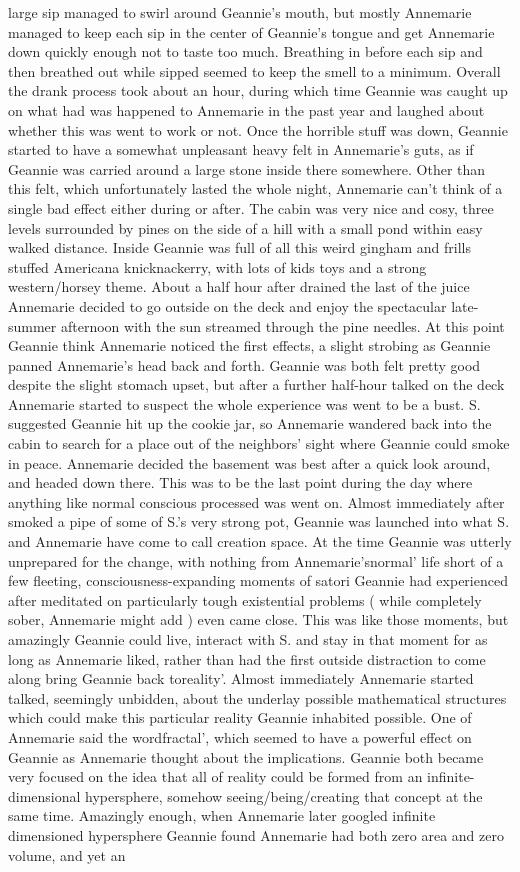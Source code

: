 \documentclass[12pt]{book}
\begin{document}
large sip managed to swirl around Geannie's mouth, but mostly Annemarie managed to keep each sip in the center of Geannie's tongue and get Annemarie down quickly enough not to taste too much. Breathing in before each sip and then breathed out while sipped seemed to keep the smell to a minimum. Overall the drank process took about an hour, during which time Geannie was caught up on what had was happened to Annemarie in the past year and laughed about whether this was went to work or not. Once the horrible stuff was down, Geannie started to have a somewhat unpleasant heavy felt in Annemarie's guts, as if Geannie was carried around a large stone inside there somewhere. Other than this felt, which unfortunately lasted the whole night, Annemarie can't think of a single bad effect either during or after. The cabin was very nice and cosy, three levels surrounded by pines on the side of a hill with a small pond within easy walked distance. Inside Geannie was full of all this weird gingham and frills stuffed Americana knicknackerry, with lots of kids toys and a strong western/horsey theme. About a half hour after drained the last of the juice Annemarie decided to go outside on the deck and enjoy the spectacular late-summer afternoon with the sun streamed through the pine needles. At this point Geannie think Annemarie noticed the first effects, a slight strobing as Geannie panned Annemarie's head back and forth. Geannie was both felt pretty good despite the slight stomach upset, but after a further half-hour talked on the deck Annemarie started to suspect the whole experience was went to be a bust. S. suggested Geannie hit up the cookie jar, so Annemarie wandered back into the cabin to search for a place out of the neighbors' sight where Geannie could smoke in peace. Annemarie decided the basement was best after a quick look around, and headed down there. This was to be the last point during the day where anything like normal conscious processed was went on. Almost immediately after smoked a pipe of some of S.'s very strong pot, Geannie was launched into what S. and Annemarie have come to call creation space. At the time Geannie was utterly unprepared for the change, with nothing from Annemarie'snormal' life short of a few fleeting, consciousness-expanding moments of satori Geannie had experienced after meditated on particularly tough existential problems ( while completely sober, Annemarie might add ) even came close. This was like those moments, but amazingly Geannie could live, interact with S. and stay in that moment for as long as Annemarie liked, rather than had the first outside distraction to come along bring Geannie back toreality'. Almost immediately Annemarie started talked, seemingly unbidden, about the underlay possible mathematical structures which could make this particular reality Geannie inhabited possible. One of Annemarie said the wordfractal', which seemed to have a powerful effect on Geannie as Annemarie thought about the implications. Geannie both became very focused on the idea that all of reality could be formed from an infinite-dimensional hypersphere, somehow seeing/being/creating that concept at the same time. Amazingly enough, when Annemarie later googled infinite dimensioned hypersphere Geannie found Annemarie had both zero area and zero volume, and yet an 
\end{document}
